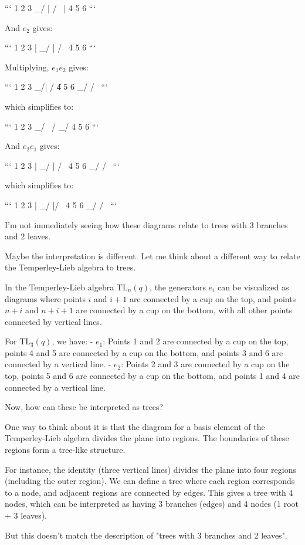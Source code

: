 \documentclass[12p]{article}
\newcounter{reasoningcounter}
\newenvironment{reasoning}[1][]
{\refstepcounter{reasoningcounter}%
\begin{tcolorbox}[
    title=Reasoning \thereasoningcounter: #1,
    colback=white, %
    colframe=gray,
    coltext=black, %
    fonttitle=\bfseries\normalsize,
    top=2mm,
    bottom=2mm,
    enlarge top initially by=5mm
]
\small
}
{\end{tcolorbox}}
\begin{document}
\begin{reasoning}
```
1 2 3
 \_/ |
 / \ |
4 5 6
```

And $e_2$ gives:

```
1 2 3
|  \_/
|  / \
4 5 6
```

Multiplying, $e_1 e_2$ gives:

```
1 2 3
 \_/|
 / \|
4 5 6
    \_/
    / \
```

which simplifies to:

```
1 2 3
 \_/ \
 / \_/
4 5 6
```

And $e_2 e_1$ gives:

```
1 2 3
|  \_/
|  / \
4 5 6
 \_/
 / \
```

which simplifies to:

```
1 2 3
| \_/
|/ \
4 5 6
 \_/
 / \
```

I'm not immediately seeing how these diagrams relate to trees with 3 branches and 2 leaves.

Maybe the interpretation is different. Let me think about a different way to relate the Temperley-Lieb algebra to trees.

In the Temperley-Lieb algebra $\text{TL}_n(q)$, the generators $e_i$ can be visualized as diagrams where points $i$ and $i+1$ are connected by a cup on the top, and points $n+i$ and $n+i+1$ are connected by a cup on the bottom, with all other points connected by vertical lines.

For $\text{TL}_3(q)$, we have:
- $e_1$: Points 1 and 2 are connected by a cup on the top, points 4 and 5 are connected by a cup on the bottom, and points 3 and 6 are connected by a vertical line.
- $e_2$: Points 2 and 3 are connected by a cup on the top, points 5 and 6 are connected by a cup on the bottom, and points 1 and 4 are connected by a vertical line.

Now, how can these be interpreted as trees?

One way to think about it is that the diagram for a basis element of the Temperley-Lieb algebra divides the plane into regions. The boundaries of these regions form a tree-like structure. 

For instance, the identity (three vertical lines) divides the plane into four regions (including the outer region). We can define a tree where each region corresponds to a node, and adjacent regions are connected by edges. This gives a tree with 4 nodes, which can be interpreted as having 3 branches (edges) and 4 nodes (1 root + 3 leaves).

But this doesn't match the description of "trees with 3 branches and 2 leaves".


\end{reasoning}
\end{document}
